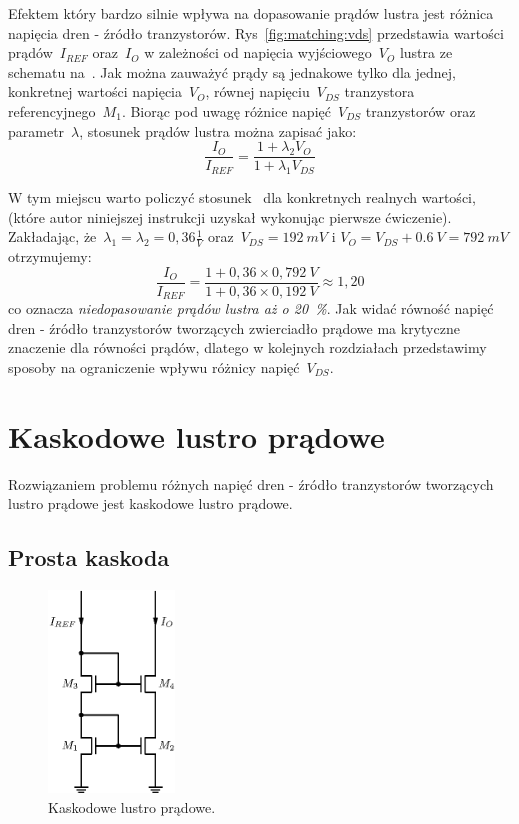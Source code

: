 \documentclass[twoside,pl,final]{labman}
\begin{document}
Efektem który bardzo silnie wpływa na dopasowanie prądów lustra jest
różnica napięcia dren - źródło tranzystorów.
Rys~\ref{fig:matching:vds} przedstawia wartości prądów~$I_{REF}$
oraz~$I_O$ w zależności od napięcia wyjściowego~$V_O$
lustra ze schematu na~.
Jak można zauważyć prądy są jednakowe tylko dla jednej,
konkretnej wartości napięcia~$V_O$,
równej napięciu~$V_{DS}$ tranzystora referencyjnego~$M_1$.
Biorąc pod uwagę różnice napięć~$V_{DS}$ tranzystorów
oraz parametr~$\lambda$, stosunek prądów lustra można zapisać jako:
\begin{equation}
  \frac{I_O}{I_{REF}} = \frac{1 + \lambda_2 V_{O}}{1 + \lambda_1 V_{DS}}
  \label{eqn:matching:vds}
\end{equation}

W tym miejscu warto policzyć stosunek~
dla konkretnych realnych wartości, (które autor niniejszej instrukcji uzyskał
wykonując pierwsze ćwiczenie).
Zakładając, że~$\lambda_1 = \lambda_2 = 0,36 \frac{1}{V}$ oraz~$V_{DS} = 192~mV$
i $V_O = V_{DS} + 0.6~V = 792~mV$ otrzymujemy:
\begin{equation}
  \frac{I_O}{I_{REF}} = \frac{1 + 0,36 \times 0,792~V}
    {1 + 0,36 \times 0,192~V} \approx 1,20
  \label{eqn:matching:result}
\end{equation}
co oznacza \emph{niedopasowanie prądów lustra aż o 20~\%}.
Jak widać równość napięć dren - źródło tranzystorów tworzących zwierciadło
prądowe ma krytyczne znaczenie dla równości prądów,
dlatego w kolejnych rozdziałach przedstawimy sposoby
na ograniczenie wpływu różnicy napięć~$V_{DS}$.

\section{Kaskodowe lustro prądowe}
\label{cascode}
Rozwiązaniem problemu różnych napięć dren - źródło tranzystorów
tworzących lustro prądowe jest kaskodowe lustro prądowe.

\subsection{Prosta kaskoda}
\label{cascode:simple}

\begin{figure}[!htbp]
  \centering
  \includegraphics[width=0.3\textwidth]{cascode_simple}
  \caption{Kaskodowe lustro prądowe.}
  \label{fig:cascode:simple}
\end{figure}
\end{document}
